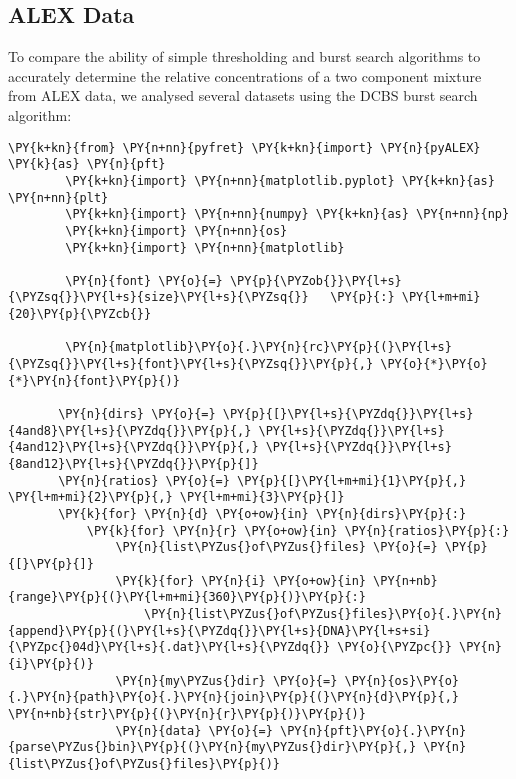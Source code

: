 \subsection{ALEX Data}
\label{app:code_samples_ALEX_mix}
To compare the ability of simple thresholding and burst search algorithms to accurately determine the relative concentrations of a two component mixture from ALEX data, we analysed several datasets using the DCBS burst search algorithm:

\begin{Verbatim}[commandchars=\\\{\}, fontsize=\scriptsize]
        \PY{k+kn}{from} \PY{n+nn}{pyfret} \PY{k+kn}{import} \PY{n}{pyALEX} \PY{k}{as} \PY{n}{pft}
        \PY{k+kn}{import} \PY{n+nn}{matplotlib.pyplot} \PY{k+kn}{as} \PY{n+nn}{plt}
        \PY{k+kn}{import} \PY{n+nn}{numpy} \PY{k+kn}{as} \PY{n+nn}{np}
        \PY{k+kn}{import} \PY{n+nn}{os}
        \PY{k+kn}{import} \PY{n+nn}{matplotlib}
        
        \PY{n}{font} \PY{o}{=} \PY{p}{\PYZob{}}\PY{l+s}{\PYZsq{}}\PY{l+s}{size}\PY{l+s}{\PYZsq{}}   \PY{p}{:} \PY{l+m+mi}{20}\PY{p}{\PYZcb{}}
        
        \PY{n}{matplotlib}\PY{o}{.}\PY{n}{rc}\PY{p}{(}\PY{l+s}{\PYZsq{}}\PY{l+s}{font}\PY{l+s}{\PYZsq{}}\PY{p}{,} \PY{o}{*}\PY{o}{*}\PY{n}{font}\PY{p}{)}

       \PY{n}{dirs} \PY{o}{=} \PY{p}{[}\PY{l+s}{\PYZdq{}}\PY{l+s}{4and8}\PY{l+s}{\PYZdq{}}\PY{p}{,} \PY{l+s}{\PYZdq{}}\PY{l+s}{4and12}\PY{l+s}{\PYZdq{}}\PY{p}{,} \PY{l+s}{\PYZdq{}}\PY{l+s}{8and12}\PY{l+s}{\PYZdq{}}\PY{p}{]}
       \PY{n}{ratios} \PY{o}{=} \PY{p}{[}\PY{l+m+mi}{1}\PY{p}{,} \PY{l+m+mi}{2}\PY{p}{,} \PY{l+m+mi}{3}\PY{p}{]}
       \PY{k}{for} \PY{n}{d} \PY{o+ow}{in} \PY{n}{dirs}\PY{p}{:}
           \PY{k}{for} \PY{n}{r} \PY{o+ow}{in} \PY{n}{ratios}\PY{p}{:}      
               \PY{n}{list\PYZus{}of\PYZus{}files} \PY{o}{=} \PY{p}{[}\PY{p}{]}
               \PY{k}{for} \PY{n}{i} \PY{o+ow}{in} \PY{n+nb}{range}\PY{p}{(}\PY{l+m+mi}{360}\PY{p}{)}\PY{p}{:}
                   \PY{n}{list\PYZus{}of\PYZus{}files}\PY{o}{.}\PY{n}{append}\PY{p}{(}\PY{l+s}{\PYZdq{}}\PY{l+s}{DNA}\PY{l+s+si}{\PYZpc{}04d}\PY{l+s}{.dat}\PY{l+s}{\PYZdq{}} \PY{o}{\PYZpc{}} \PY{n}{i}\PY{p}{)}
               \PY{n}{my\PYZus{}dir} \PY{o}{=} \PY{n}{os}\PY{o}{.}\PY{n}{path}\PY{o}{.}\PY{n}{join}\PY{p}{(}\PY{n}{d}\PY{p}{,} \PY{n+nb}{str}\PY{p}{(}\PY{n}{r}\PY{p}{)}\PY{p}{)}
               \PY{n}{data} \PY{o}{=} \PY{n}{pft}\PY{o}{.}\PY{n}{parse\PYZus{}bin}\PY{p}{(}\PY{n}{my\PYZus{}dir}\PY{p}{,} \PY{n}{list\PYZus{}of\PYZus{}files}\PY{p}{)}
           

\end{Verbatim}
